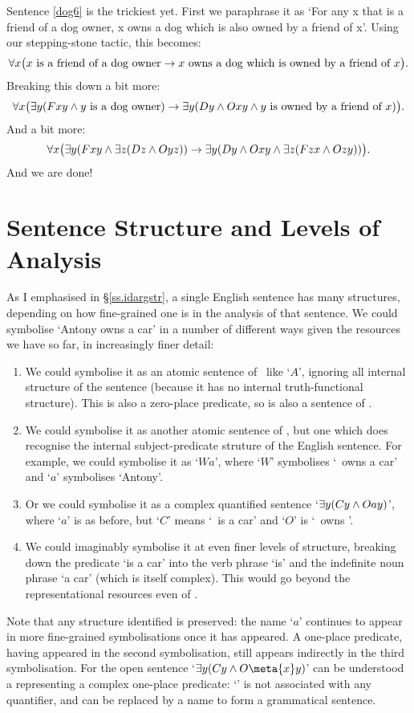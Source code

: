 Sentence \ref{dog6} is the trickiest yet. First we paraphrase it as `For any x that is a friend of a dog owner, x owns a dog which is also owned by a friend of x'. Using our stepping-stone tactic, this becomes:
$$\forall x\bigl(x\text{ is a friend of a dog owner}\rightarrow x\text{ owns a dog which is owned by a friend of }x\bigr).$$
Breaking this down a bit more:
$$\forall x\bigl(\exists y(Fxy \wedge y\text{ is a dog owner})\rightarrow \exists y(Dy \wedge Oxy \wedge y\text{ is owned by a friend of }x) \bigr).$$
And a bit more: 
$$\forall x\bigl(\exists y(Fxy \wedge \exists z(Dz \wedge Oyz)) \rightarrow \exists y(Dy \wedge Oxy \wedge \exists z(Fzx \wedge Ozy)) \bigr).$$
And we are done!

\section{Sentence Structure and Levels of Analysis} %
\label{sec:structure_and_levels_of_analysis}


As I emphasised in §\ref{ss.idargstr}, a single English sentence has many structures, depending on how fine-grained one is in the analysis of that sentence. We could symbolise `Antony owns a car' in a number of different ways given the resources we have so far, in increasingly finer detail: \begin{enumerate}
	\item We could symbolise it as an atomic sentence of \TFL\ like `$A$', ignoring all internal structure of the sentence (because it has no internal truth-functional structure). This is also a zero-place predicate, so is also a sentence of \FOL. 
	\item We could symbolise it as another atomic sentence of \FOL, but one which does recognise the internal subject-predicate struture of the English sentence. For example, we could symbolise it as `$Wa$', where `$W$' symbolises `\ owns a car' and `$a$' symbolises `Antony'.
	\item Or we could symbolise it as a complex quantified sentence `$\exists y (Cy \wedge Oay)$', where `$a$' is as before, but `$C$' means `\ is a car' and `$O$' is `\ owns '.
	\item We could imaginably symbolise it at even finer levels of structure, breaking down the predicate `is a car' into the verb phrase `is' and the indefinite noun phrase `a car' (which is itself complex). This would go beyond the representational resources even of \FOL.
\end{enumerate} Note that any structure identified is preserved: the name `$a$' continues to appear in more fine-grained symbolisations once it has appeared. A one-place predicate, having appeared in the second symbolisation, still appears indirectly in the third symbolisation. For the open sentence `$\exists y (Cy \eand O\meta{x}y)$' can be understood a representing a complex one-place predicate:  `' is not associated with any quantifier, and can be replaced by a name to form a grammatical sentence.

